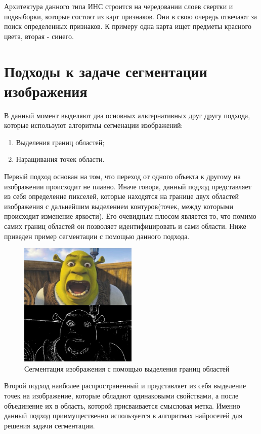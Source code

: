 \documentclass[bachelor, och, coursework]{shiza}
\begin{document}
Архитектура данного типа ИНС строится на чередовании слоев свертки и подвыборки, которые состоят из карт признаков. Они в свою очередь отвечают за поиск определенных
признаков. К примеру одна карта ищет предметы красного цвета, вторая - синего.

\section{Подходы к задаче сегментации изображения}

В данный момент выделяют два основных альтернативных друг другу подхода, которые используют алгоритмы сегменации изображений:

\begin{enumerate}
    \item Выделения границ областей;
    \item Наращивания точек области.
\end{enumerate}

Первый подход основан на том, что переход от одного объекта к другому на изображении происходит не плавно. Иначе
говоря, данный подход представляет из себя определение пикселей, которые находятся на границе двух областей 
изображения с дальнейшим выделением контуров(точек, между которыми происходит изменение яркости). Его очевидным 
плюсом является то, что помимо самих границ областей он позволяет идентифицировать и сами области. Ниже приведен
пример сегментации с помощью данного подхода.

\begin{figure}[H]
    \centering
    \includegraphics[width=0.5\textwidth]{1}
    \caption{Сегментация изображения с помощью выделения границ областей}
    \label{fig:img1}
\end{figure}

Второй подход наиболее распространенный и представляет из себя выделение точек на изображение, которые обладают 
одинаковыми свойствами, а после объединение их в область, которой присваивается смысловая метка. Именно данный
подход приимущественно используется в алгоритмах найросетей для решения задачи сегментации.
\end{document}
